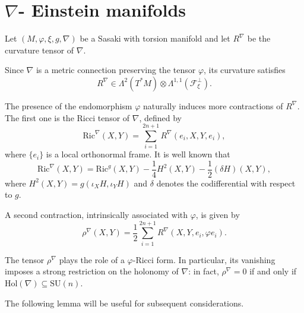 \documentclass{article}
\theoremstyle{definition}
\renewcommand{\phi}{\varphi}
\numberwithin{equation}{section}
\begin{document}
\section{\texorpdfstring{$\nabla$}{}- Einstein manifolds}

Let \((M, \phi, \xi, g, \nabla)\) be a Sasaki with torsion manifold and let $R^\nabla$ be the curvature tensor of $\nabla$.

Since $\nabla$ is a metric connection preserving the tensor $\phi$, its curvature satisfies
\[
R^\nabla \in \Lambda^2(T^*M)\otimes \Lambda^{1,1}(\mathcal{F}^\perp_\xi).
\]

The presence of the endomorphism $\phi$ naturally induces more contractions of $R^\nabla$. The first one is the Ricci tensor of $\nabla$, defined by 
\[
\mathrm{Ric}^\nabla(X,Y)=\sum_{i=1}^{2n+1} R^\nabla(e_i,X,Y,e_i),
\]
where $\{e_i\}$ is a local orthonormal frame. It is well known that
\[
\mathrm{Ric}^\nabla(X,Y)
= \mathrm{Ric}^g(X,Y) - \frac{1}{4} H^2(X,Y) - \frac{1}{2} (\delta H)(X,Y),
\]
where $H^2(X,Y)=g(\iota_X H,\iota_Y H)$ and $\delta$ denotes the codifferential with respect to $g$.

A second contraction, intrinsically associated with $\phi$, is given by
\[
\rho^\nabla(X,Y)=\frac{1}{2}\sum_{i=1}^{2n+1} R^\nabla(X,Y,e_i,\phi e_i).
\]

The tensor $\rho^\nabla$ plays the role of a $\phi$-Ricci form. In particular, its vanishing imposes a strong restriction on the holonomy of $\nabla$: in fact, $\rho^\nabla=0$ if and only if $\mathrm{Hol}(\nabla)\subseteq \mathrm{SU}(n).$


\medskip 
The following lemma will be useful for subsequent considerations.
\end{document}
